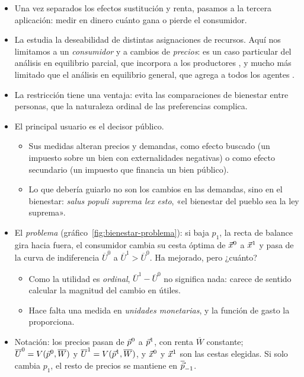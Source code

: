 \documentclass[11pt]{article}
\begin{document}
\begin{itemize}
\item Una vez separados los efectos sustitución y renta, pasamos a la tercera aplicación: medir en dinero cuánto gana o pierde el consumidor.
\item La  estudia la deseabilidad de distintas asignaciones de recursos. Aquí nos limitamos a un \emph{consumidor} y a cambios de \emph{precios}: es un caso particular del análisis en equilibrio parcial, que incorpora a los productores , y mucho más limitado que el análisis en equilibrio general, que agrega a todos los agentes  .
\item La restricción tiene una ventaja: evita las comparaciones de bienestar entre personas, que la naturaleza ordinal de las preferencias complica.
\item El principal usuario es el decisor público.
  \begin{itemize}
  \item Sus medidas alteran precios y demandas, como efecto buscado (un impuesto sobre un bien con externalidades negativas) o como efecto secundario (un impuesto que financia un bien público).
  \item Lo que debería guiarlo no son los cambios en las demandas, sino en el bienestar: \emph{salus populi suprema lex esto}, «el bienestar del pueblo sea la ley suprema»\nocite{CiceronLegibus}.
  \end{itemize}
\item El \emph{problema} (gráfico~\ref{fig:bienestar-problema}): si baja $p_1$, la recta de balance gira hacia fuera, el consumidor cambia su cesta óptima de $\vec{x}^0$ a $\vec{x}^1$ y pasa de la curva de indiferencia $\overline{U}^0$ a $\overline{U}^1>\overline{U}^0$. Ha mejorado, pero ¿cuánto?
  \begin{itemize}
  \item Como la utilidad es \emph{ordinal}, $\overline{U}^1-\overline{U}^0$ no significa nada: carece de sentido calcular la magnitud del cambio en útiles.
  \item Hace falta una medida en \emph{unidades monetarias}, y la función de gasto la proporciona.
  \end{itemize}
\item Notación: los precios pasan de $\vec{p}^0$ a $\vec{p}^1$, con renta $\overline{W}$ constante; $\overline{U}^0=V(\vec{p}^0,\overline{W})$ y $\overline{U}^1=V(\vec{p}^1,\overline{W})$, y $\vec{x}^0$ y $\vec{x}^1$ son las cestas elegidas. Si solo cambia $p_1$, el resto de precios se mantiene en $\overline{\vec{p}}_{-1}$.
\end{itemize}
\end{document}

